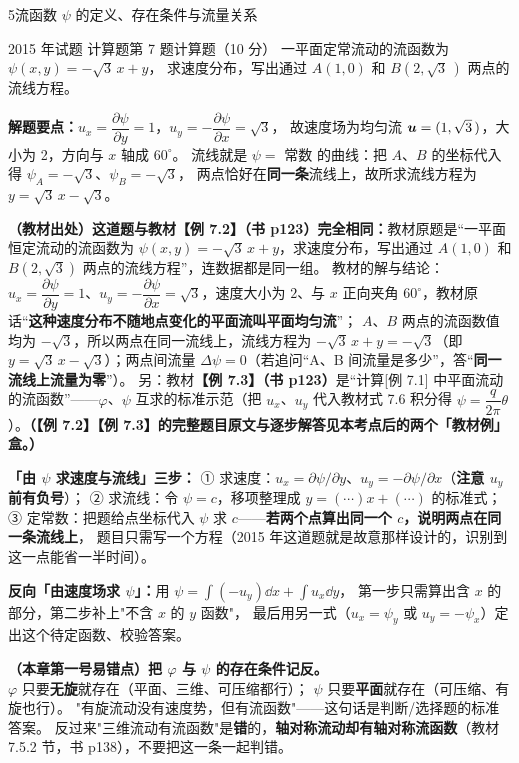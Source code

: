 \begin{kaodian}{5}{流函数 $\psi$ 的定义、存在条件与流量关系}
\begin{zhenti}{2015 年试题 计算题第 7 题}{计算题（10 分）}
一平面定常流动的流函数为 $\psi(x,y)=-\sqrt{3}\,x+y$，
求速度分布，写出通过 $A(1,0)$ 和 $B(2,\sqrt{3}\,)$ 两点的流线方程。
\end{zhenti}
\noindent\textbf{解题要点：}$u_x=\dfrac{\partial\psi}{\partial y}=1$，$u_y=-\dfrac{\partial\psi}{\partial x}=\sqrt{3}$，
故速度场为均匀流 $\bm{u}=(1,\sqrt{3}\,)$，大小为 2，方向与 $x$ 轴成 $60^\circ$。
流线就是 $\psi=$ 常数 的曲线：把 $A$、$B$ 的坐标代入得 $\psi_A=-\sqrt{3}$、$\psi_B=-\sqrt{3}$，
两点恰好在\textbf{同一条}流线上，故所求流线方程为 $y=\sqrt{3}\,x-\sqrt{3}$。

\noindent\textbf{（教材出处）这道题与教材\textbf{【例 7.2】（书 p123）完全相同}：}教材原题是“一平面恒定流动的流函数为 $\psi(x,y)=-\sqrt{3}\,x+y$，求速度分布，写出通过 $A(1,0)$ 和 $B(2,\sqrt{3})$ 两点的流线方程”，连数据都是同一组。
教材的解与结论：$u_x=\dfrac{\partial\psi}{\partial y}=1$、$u_y=-\dfrac{\partial\psi}{\partial x}=\sqrt{3}$，速度大小为 $2$、与 $x$ 正向夹角 $60^\circ$，教材原话“\textbf{这种速度分布不随地点变化的平面流叫平面均匀流}”；
$A$、$B$ 两点的流函数值均为 $-\sqrt{3}$，所以两点在同一流线上，流线方程为 $-\sqrt{3}\,x+y=-\sqrt{3}$（即 $y=\sqrt{3}\,x-\sqrt{3}$）；两点间流量 $\Delta\psi=0$（若追问“A、B 间流量是多少”，答“\textbf{同一流线上流量为零}”）。
另：教材\textbf{【例 7.3】（书 p123）}是“计算[例 7.1] 中平面流动的流函数”——$\varphi$、$\psi$ 互求的标准示范（把 $u_x$、$u_y$ 代入教材式 7.6 积分得 $\psi=\dfrac{q}{2\pi}\theta$）。\textbf{（【例 7.2】【例 7.3】的完整题目原文与逐步解答见本考点后的两个「教材例」盒。）}

\begin{banfa}
\textbf{「由 $\psi$ 求速度与流线」三步：}
① 求速度：$u_x=\partial\psi/\partial y$、$u_y=-\partial\psi/\partial x$（\textbf{注意 $u_y$ 前有负号}）；
② 求流线：令 $\psi=c$，移项整理成 $y=(\cdots)x+(\cdots)$ 的标准式；
③ 定常数：把题给点坐标代入 $\psi$ 求 $c$——\textbf{若两个点算出同一个 $c$，说明两点在同一条流线上}，
题目只需写一个方程（2015 年这道题就是故意那样设计的，识别到这一点能省一半时间）。

\textbf{反向「由速度场求 $\psi$」：}用 $\psi=\int(-u_y)\dd x+\int u_x\dd y$，
第一步只需算出含 $x$ 的部分，第二步补上"不含 $x$ 的 $y$ 函数"，
最后用另一式（$u_x=\psi_y$ 或 $u_y=-\psi_x$）定出这个待定函数、校验答案。
\end{banfa}

\begin{yicuo}
\textbf{（本章第一号易错点）把 $\varphi$ 与 $\psi$ 的存在条件记反。}\\
$\varphi$ 只要\textbf{无旋}就存在（平面、三维、可压缩都行）；
$\psi$ 只要\textbf{平面}就存在（可压缩、有旋也行）。
"有旋流动没有速度势，但有流函数"——这句话是判断/选择题的标准答案。
反过来"三维流动有流函数"是\textbf{错}的，\textbf{轴对称流动却有轴对称流函数}（教材 7.5.2 节，书 p138），不要把这一条一起判错。
\end{yicuo}
\end{kaodian}

